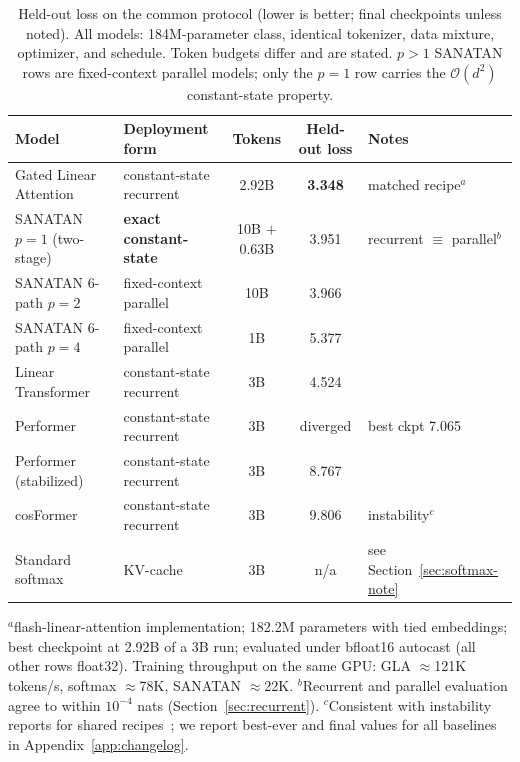 \documentclass{article}
\newcommand{\cO}{\mathcal{O}}
\begin{document}
\begin{table}[t]
\centering
\caption{Held-out loss on the common protocol (lower is better; final checkpoints unless noted). All models: 184M-parameter class, identical tokenizer, data mixture, optimizer, and schedule. Token budgets differ and are stated. $p{>}1$ SANATAN rows are fixed-context parallel models; only the $p{=}1$ row carries the $\cO(d^2)$ constant-state property.}
\label{tab:results}
\small
\setlength{\tabcolsep}{3.5pt}
\begin{tabular}{llccl}
\toprule
Model & Deployment form & Tokens & Held-out loss & Notes \\
\midrule
Gated Linear Attention~\cite{yang2024gla} & constant-state recurrent & 2.92B & \textbf{3.348} & matched recipe$^{a}$ \\
\midrule
SANATAN $p{=}1$ (two-stage) & \textbf{exact constant-state} & 10B $+$ 0.63B & 3.951 & recurrent $\equiv$ parallel$^{b}$ \\
SANATAN 6-path $p{=}2$ & fixed-context parallel & 10B & 3.966 & \\
SANATAN 6-path $p{=}4$ & fixed-context parallel & 1B & 5.377 & \\
\midrule
Linear Transformer~\cite{katharopoulos2020transformers} & constant-state recurrent & 3B & 4.524 & \\
Performer~\cite{choromanski2021rethinking} & constant-state recurrent & 3B & diverged & best ckpt 7.065 \\
Performer (stabilized) & constant-state recurrent & 3B & 8.767 & \\
cosFormer~\cite{qin2022cosformer} & constant-state recurrent & 3B & 9.806 & instability$^{c}$ \\
\midrule
Standard softmax & KV-cache & 3B & n/a & see Section~\ref{sec:softmax-note} \\
\bottomrule
\end{tabular}

\vspace{2pt}
{\footnotesize
$^{a}$flash-linear-attention implementation; 182.2M parameters with tied embeddings; best checkpoint at 2.92B of a 3B run; evaluated under bfloat16 autocast (all other rows float32). Training throughput on the same GPU: GLA $\approx$121K tokens/s, softmax $\approx$78K, SANATAN $\approx$22K.
$^{b}$Recurrent and parallel evaluation agree to within $10^{-4}$ nats (Section~\ref{sec:recurrent}).
$^{c}$Consistent with instability reports for shared recipes~\cite{qin2022cosformer}; we report best-ever and final values for all baselines in Appendix~\ref{app:changelog}.}
\end{table}
\end{document}
